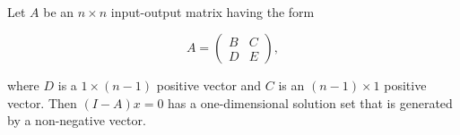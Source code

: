 \begin{theorem}
	\hfill\\
	Let $A$ be an $n \times n$ input-output matrix having the form

	\[A = \begin{pmatrix}
			B & C \\
			D & E
		\end{pmatrix},\]

	where $D$ is a $1 \times (n -1)$ positive vector and $C$ is an $(n-1)\times 1$ positive vector. Then $(I -A)x = 0$ has a one-dimensional solution set that is generated by a non-negative vector.
\end{theorem}
